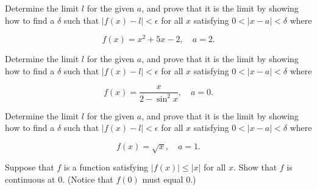 \documentclass[12pt,letterpaper]{hmcpset}
\newcommand{\paren}[1]{\left(#1\right)}
\newcommand{\abs}[1]{\left|#1\right|}
\begin{document}

\begin{problem}
    Determine the limit $l$ for the given $a$, and prove that it is the limit by showing how to find a $\delta$ such that $\abs{f\paren{x} - l} < \epsilon$ for all $x$ satisfying $0 < \abs{x - a} < \delta$ where

    \[
        f\paren{x} = x^2 + 5x - 2,\quad a = 2.
    \]
\end{problem}

\begin{solution}

\end{solution}

\begin{problem}
    Determine the limit $l$ for the given $a$, and prove that it is the limit by showing how to find a $\delta$ such that $\abs{f\paren{x} - l} < \epsilon$ for all $x$ satisfying $0 < \abs{x - a} < \delta$ where

    \[
        f\paren{x} = \frac{x}{2 - \sin^2 x},\quad a = 0.
    \]
\end{problem}

\begin{solution}

\end{solution}

\begin{problem}
    Determine the limit $l$ for the given $a$, and prove that it is the limit by showing how to find a $\delta$ such that $\abs{f\paren{x} - l} < \epsilon$ for all $x$ satisfying $0 < \abs{x - a} < \delta$ where

    \[
        f\paren{x} = \sqrt{x},\quad a = 1.
    \]
\end{problem}

\begin{solution}

\end{solution}

\begin{problem}
    Suppose that $f$ is a function satisfying $\abs{f\paren{x}} \le \abs{x}$ for all $x$. Show that $f$ is continuous at $0$. (Notice that $f\paren{0}$ must equal $0$.)
\end{problem}

\begin{solution}

\end{solution}
\end{document}
